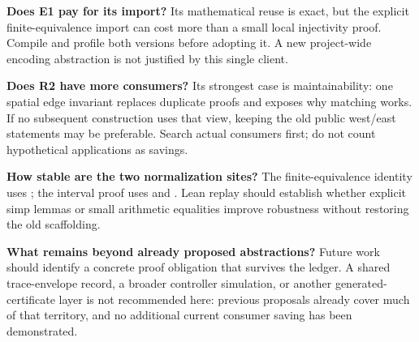 \textbf{Does E1 pay for its import?} Its mathematical reuse is exact, but the explicit finite-equivalence import can cost more than a small local injectivity proof. Compile and profile both versions before adopting it. A new project-wide encoding abstraction is not justified by this single client.

\textbf{Does R2 have more consumers?} Its strongest case is maintainability: one spatial edge invariant replaces duplicate proofs and exposes why matching works. If no subsequent construction uses that view, keeping the old public west/east statements may be preferable. Search actual consumers first; do not count hypothetical applications as savings.

\textbf{How stable are the two normalization sites?} The finite-equivalence identity uses ; the interval proof uses  and . Lean replay should establish whether explicit simp lemmas or small arithmetic equalities improve robustness without restoring the old scaffolding.

\textbf{What remains beyond already proposed abstractions?} Future work should identify a concrete proof obligation that survives the ledger. A shared trace-envelope record, a broader controller simulation, or another generated-certificate layer is not recommended here: previous proposals already cover much of that territory, and no additional current consumer saving has been demonstrated.

